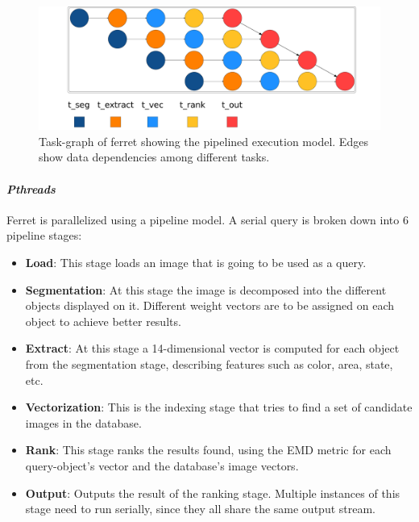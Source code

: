 {\begin{figure}[t!]%
	\center
	\includegraphics[width=0.9\columnwidth]{task_benchmarks/figures/ferret_tg}%
	\caption{Task-graph of ferret showing the pipelined execution model.  Edges show data dependencies among different tasks.}
	\label{fig:ferret_tg}%
	\vspace{.5cm}
\end{figure}

\paragraph{\textit{Pthreads}}
Ferret is parallelized using a pipeline model.  A serial query is broken down into 
6 pipeline stages:
\begin{itemize}
  \item \textbf{Load}:  This stage loads an image that is going to be used as a query.
  \item \textbf{Segmentation}:  At this stage the image is decomposed into the different objects displayed on it.
	Different weight vectors are to be assigned on each object to achieve better results.
  \item \textbf{Extract}:  At this stage a 14-dimensional vector is computed for each object from the segmentation stage, 
														describing features such as color, area, state, etc.
  \item \textbf{Vectorization}:  This is the indexing stage that tries to find a set of candidate images in the database.
  \item \textbf{Rank}:  This stage ranks the results found, using the EMD metric for each query-object's vector
	and the database's image vectors.
  \item \textbf{Output}:  Outputs the result of the ranking stage.  Multiple instances of
	this stage need to run serially, since they all share the same output stream.

\end{itemize}

}
